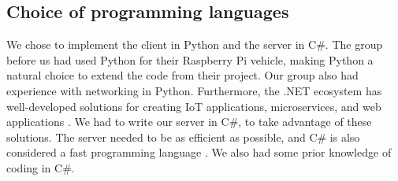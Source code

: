 \subsection{Choice of programming languages}
We chose to implement the client in Python and the server in C\#. The group before us had used Python for their Raspberry Pi vehicle, making Python a natural choice to extend the code from their project. Our group also had experience with networking in Python. Furthermore, the .NET ecosystem has well-developed solutions for creating IoT applications, microservices, and web applications \parencite{dotnet}. We had to write our server in C\#, to take advantage of these solutions. The server needed to be as efficient as possible, and C\# is also considered a fast programming language \parencite{csharp}. We also had some prior knowledge of coding in C\#.